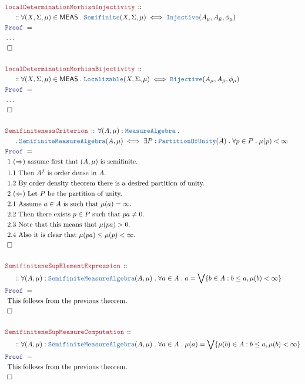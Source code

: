 \documentclass[12pt]{scrartcl}
\newcommand{\TYPE}[1]{\textcolor{NavyBlue}{\mathtt{#1}}}
\newcommand{\LOGIC}[1]{\textcolor{Blue}{\mathtt{#1}}}
\newcommand{\THM}[1]{\textcolor{Maroon}{\mathtt{#1}}}
\renewcommand{\.}{\; . \;}
\newcommand{\Theorem}[2]{& \THM{#1} \, :: \, #2 \\ & \Proof = \\ }
\newcommand{\NewLine}{\\ & \kern 1pc}
\newcommand{\Page}[1]{ \begin{align*} #1 \end{align*}   }
\newcommand{\NoProof}{ & \ldots \\ \EndProof}
\newcommand{\QED}{\; \square}
\newcommand{\EndProof}{& \QED \\}
\newcommand{\Proof}{\LOGIC{Proof} \; }
\newcommand{\Explain}[1]{& \text{#1.} \\}
\newcommand{\Inj}{\TYPE{Injective}}
\newcommand{\Bij}{\TYPE{Bijective}}
\newcommand{\PoU}{\TYPE{PartitionOfUnity}}
\newcommand{\Semifinite}{\TYPE{Semifinite}}
\newcommand{\Loc}{\TYPE{Localizable}}
\newcommand{\MEAS}{\mathsf{MEAS}}
\newcommand{\MA}{\TYPE{MeasureAlgebra}}
\begin{document}
\Page{
	\Theorem{localDeterminationMorhismInjectivity}
	{
		\NewLine ::		
		\forall (X,\Sigma,\mu) \in \MEAS \.
		\Semifinite(X,\Sigma,\mu)
		\iff
		\Inj(A_\mu,A_{\bar \mu},\phi_\mu)
	}
	\NoProof
	\\
	\Theorem{localDeterminationMorhismBijectivity}
	{
		\NewLine ::		
		\forall (X,\Sigma,\mu) \in \MEAS \.
		\Loc(X,\Sigma,\mu)
		\iff
		\Bij(A_\mu,A_{\bar \mu},\phi_\mu)
	}
	\NoProof
	\\
	\Theorem{SemifinitenessCriterion}
	{
		\forall (A,\mu) : \MA \. \NewLine \.
		\Semifinite\MA(A,\mu)
		\iff
		\exists P : \PoU(A) \. \forall p \in P \. \mu(p) < \infty
	}
	\Explain{ 1 $(\Rightarrow)$ assume first that $(A,\mu)$ is semifinite}
	\Explain{ 1.1 Then $A^f$ is order dense in $A$}
	\Explain{ 1.2 By order density theorem there is a desired partition of unity}
	\Explain{ 2 $(\Leftarrow)$  Let $P$ be the partition of unity}
	\Explain{ 2.1 Assume $a \in A$ is such that $\mu(a) = \infty$}
	\Explain{ 2.2 Then there exists $p \in P$ such that $pa \neq 0$}
	\Explain{ 2.3 Note that this means that $\mu(pa) > 0$}
	\Explain{ 2.4 Also it is clear that $\mu(pa) \le \mu(p) < \infty$}
	\EndProof
	\\
	\Theorem{SemifiniteneSupElementExpression}
	{
		\NewLine ::
		\forall (A,\mu) : \Semifinite\MA(A,\mu) \.
		\forall a \in A \. a = \bigvee \{ b \in A : b \le a, \mu(b) < \infty   \}
	}
	\Explain{ This follows from the previous theorem}
	\EndProof
	\\
	\Theorem{SemifiniteneSupMeasureComputation}
	{
		\NewLine ::
		\forall (A,\mu) : \Semifinite\MA(A,\mu) \.
		\forall a \in A \. \mu(a) = \bigvee \{ \mu(b) \in A : b \le a, \mu(b) < \infty   \}
	}
	\Explain{ This follows from the previous theorem}
	\EndProof
}
\newpage
\end{document}
